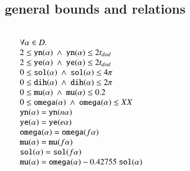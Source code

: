 \def\sland{\ \land\ }

\subsection{general bounds and relations}

$$
\begin{array}{lll}
\leftalign\\
   \forall \alpha\in D.\\
    2 \le \optt{yn}(\alpha) \sland
    \optt{yn}(\alpha) \le 2t_{dod} \\
    2 \le \optt{ye}(\alpha) \sland
    \optt{ye}(\alpha) \le 2t_{dod}\\
   0 \le \optt{sol}(\alpha) \sland
     \optt{sol}(\alpha) \le 4 \pi \\
   0 \le \optt{dih}(\alpha) \sland
     \optt{dih}(\alpha) \le 2\pi \\
   0 \le \optt{mu}(\alpha) \sland
      \optt{mu}(\alpha) \le 0.2 \\
   0 \le \optt{omega}(\alpha) \sland
      \optt{omega}(\alpha) \le XX \\
  \optt{yn}(\alpha) = \optt{yn}(n\alpha) \\
  \optt{ye}(\alpha) = \optt{ye}(e\alpha) \\
  \optt{omega}(\alpha) = \optt{omega}(f\alpha) \\
  \optt{mu}(\alpha) = \optt{mu}(f\alpha) \\
  \optt{sol}(\alpha)= \optt{sol}(f\alpha) \\
  \optt{mu}(\alpha) = \optt{omega}(\alpha) - 0.42755\ \optt{sol}(\alpha) \\

\end{array}
$$



